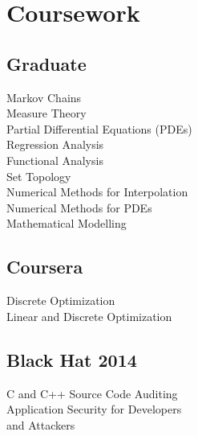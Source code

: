 \documentclass[letterpaper]{clinton-resume}
\begin{document}
\begin{minipage}[t]{0.33\textwidth}
\section{Coursework}

\subsection{Graduate}
Markov Chains\\
Measure Theory\\
Partial Differential Equations (PDEs)\\
Regression Analysis\\
Functional Analysis\\
Set Topology\\
Numerical Methods for Interpolation\\
Numerical Methods for PDEs\\
Mathematical Modelling\\
\subsection{Coursera}
Discrete Optimization\\
Linear and Discrete Optimization\\
\subsection{Black Hat 2014}
C and C++ Source Code Auditing\\
Application Security for Developers\\and Attackers\\
\end{minipage}
\end{document}
